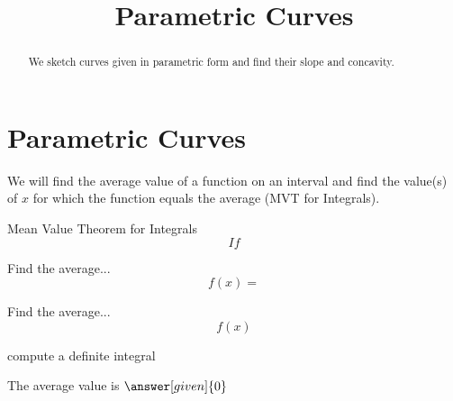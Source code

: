 \documentclass[handout]{ximera}
\title{Parametric Curves}
\begin{document}
\begin{abstract}
We sketch curves given in parametric form and find their slope and concavity.
\end{abstract}

\maketitle

\section{Parametric Curves}

We will find the average value of a function on an interval 
and find the value(s) of $x$ for which the function equals the 
average (MVT for Integrals).

\begin{theorem} Mean Value Theorem for Integrals 
\[
If
\]
\end{theorem}






\begin{example} %
Find the average...
 \[
  f(x) = 
  \]
\end{example}

\begin{center}
\begin{foldable}
\end{foldable}
\end{center}


\begin{problem} %
  Find the average...
  \[
  f(x)
  \]
    \begin{hint}
      compute a definite integral
    \end{hint}
    
		
		The average value is
		 $\answer[given]{0}$
\end{problem}


\begin{center}
\begin{foldable}
\end{foldable}
\end{center}
\end{document}
